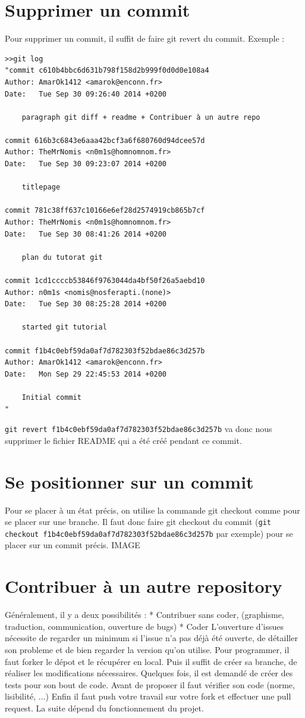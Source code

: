 \documentclass[a4paper,10pt]{report}
\begin{document}
  \section{Supprimer un commit}
  Pour supprimer un commit, il suffit de faire git revert \no du commit.
Exemple :
\begin{verbatim}
>>git log
"commit c610b4bbc6d631b798f158d2b999f0d0d0e108a4
Author: AmarOk1412 <amarok@enconn.fr>
Date:   Tue Sep 30 09:26:40 2014 +0200

    paragraph git diff + readme + Contribuer à un autre repo

commit 616b3c6843e6aaa42bcf3a6f680760d94dcee57d
Author: TheMrNomis <n0m1s@homnomnom.fr>
Date:   Tue Sep 30 09:23:07 2014 +0200

    titlepage

commit 781c38ff637c10166e6ef28d2574919cb865b7cf
Author: TheMrNomis <n0m1s@homnomnom.fr>
Date:   Tue Sep 30 08:41:26 2014 +0200

    plan du tutorat git

commit 1cd1ccccb53846f9763044da4bf50f26a5aebd10
Author: n0m1s <nomis@nosferapti.(none)>
Date:   Tue Sep 30 08:25:28 2014 +0200

    started git tutorial

commit f1b4c0ebf59da0af7d782303f52bdae86c3d257b
Author: AmarOk1412 <amarok@enconn.fr>
Date:   Mon Sep 29 22:45:53 2014 +0200

    Initial commit
"
\end{verbatim}
\verb|git revert f1b4c0ebf59da0af7d782303f52bdae86c3d257b| va donc nous supprimer le fichier README qui a été créé pendant ce commit.
  \section{Se positionner sur un commit}
  Pour se placer à un état précis, on utilise la commande git checkout comme pour se placer sur une branche. Il faut donc faire git checkout \no du commit (\verb|git checkout f1b4c0ebf59da0af7d782303f52bdae86c3d257b| par exemple) pour se placer sur un commit précis.
  IMAGE
  \section{Contribuer à un autre repository}
Généralement, il y a deux possibilités : 
* Contribuer sans coder, (graphisme, traduction, communication, ouverture de bugs)
* Coder
L'ouverture d'issues nécessite de regarder un minimum si l'issue n'a pas déjà été ouverte, de détailler son probleme et de bien regarder la version qu'on utilise.
Pour programmer, il faut forker le dépot et le récupérer en local.
Puis il suffit de créer sa branche, de réaliser les modifications nécessaires.
Quelques fois, il est demandé de créer des tests pour son bout de code.
Avant de proposer il faut vérifier son code (norme, lisibilité, ...)
Enfin il faut push votre travail sur votre fork et effectuer une pull request.
La suite dépend du fonctionnement du projet.
\end{document}
